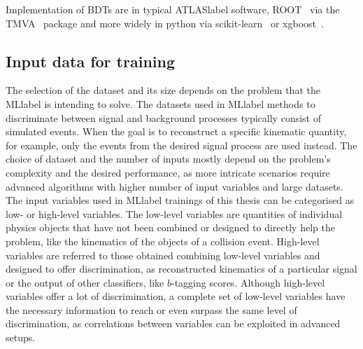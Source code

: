 Implementation of BDTs are in typical \acrshort{ATLASlabel} software, ROOT~\cite{BRUN199781} via the TMVA~\cite{TMVA} package and more widely in python via scikit-learn~\cite{scikit-learn} or xgboost~\cite{Chen_2016}.

\subsection{Input data for training}

The selection of the dataset and its size depends on the problem that the \acrshort{MLlabel} is intending to solve. The datasets used in \acrshort{MLlabel} methods to discriminate between signal and background processes typically consist of simulated events. When the goal is to reconstruct a specific kinematic quantity, for example, only the events from the desired signal process are used instead. The choice of dataset and the number of inputs mostly depend on the problem's complexity and the desired performance, as more intricate scenarios require advanced algorithms with higher number of input variables and large datasets.\\

The input variables used in \acrshort{MLlabel} trainings of this thesis can be categorised as low- or high-level variables. The low-level variables are quantities of individual physics objects that have not been combined or designed to directly help the problem, like the kinematics of the objects of a collision event. High-level variables are referred to those obtained combining low-level variables and designed to offer discrimination, as reconstructed kinematics of a particular signal or the output of other classifiers, like $b$-tagging scores. Although high-level variables offer a lot of discrimination, a complete set of low-level variables have the necessary information to reach or even surpass the same level of discrimination, as correlations between variables can be exploited in advanced setups.\\

